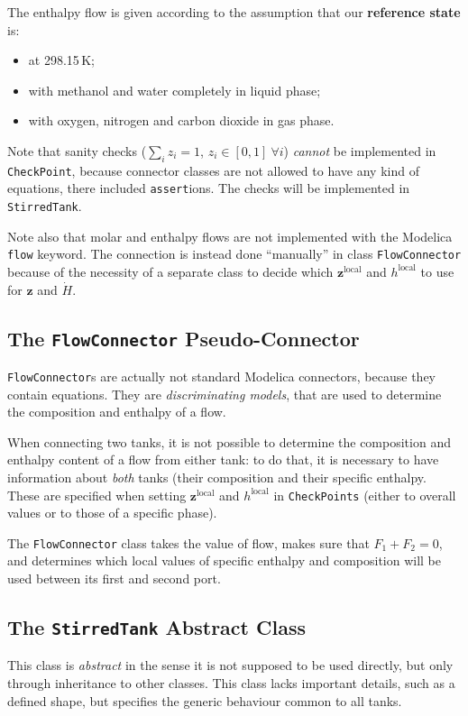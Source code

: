 \documentclass[a4paper]{article}
\begin{document}
The enthalpy flow is given according to the assumption that our
\textbf{reference state} is:

\begin{itemize}
\item at 298.15\,K;
\item with methanol and water completely in liquid phase;
\item with oxygen, nitrogen and carbon dioxide in gas phase.
\end{itemize}

Note that sanity checks ($\sum_i z_i = 1$, $z_i \in [0,1] ~ \forall i$)
\emph{cannot} be implemented in \texttt{CheckPoint}, because connector classes
are not allowed to have any kind of equations, there included
\texttt{assert}ions. The checks will be implemented in \texttt{StirredTank}.

Note also that molar and enthalpy flows are not implemented with the Modelica
\texttt{flow} keyword. The connection is instead done ``manually'' in class
\texttt{FlowConnector} because of the necessity of a separate class to decide
which $\mathbf{z}^\text{local}$ and $h^\text{local}$ to use for $\mathbf{z}$ and
$\dot H$.


\subsection{The \texttt{FlowConnector} Pseudo-Connector}
\texttt{FlowConnector}s are actually not standard Modelica connectors, because
they contain equations. They are \emph{discriminating models}, that are used to
determine the composition and enthalpy of a flow.

When connecting two tanks, it is not possible to determine the composition and
enthalpy content of a flow from either tank: to do that, it is necessary to have
information about \emph{both} tanks (their composition and their specific
enthalpy. These are specified when setting $\mathbf{z}^\text{local}$ and
$h^\text{local}$ in \texttt{CheckPoints} (either to overall values or to those
of a specific phase).

The \texttt{FlowConnector} class takes the value of flow, makes sure that $F_1
+F_2=0$, and determines which local values of specific enthalpy and
composition will be used between its first and second port.


\subsection{The \texttt{StirredTank} Abstract Class}
This class is \emph{abstract} in the sense it is not supposed to be used
directly, but only through inheritance to other classes. This class lacks
important details, such as a defined shape, but specifies the generic behaviour
common to all tanks.
\end{document}
